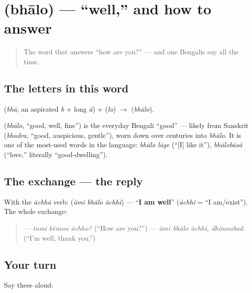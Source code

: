 \section[\bn{ভালো}]{ (bhālo) — \textquotedblleft{}well,\textquotedblright{} and how to answer}

\label{lesson:BN-C03-bhalo}



\begin{quote}
The word that answers \textquotedblleft{}how are you?\textquotedblright{} — and one Bengalis say all the time.
\end{quote}

\subsection*{The letters in this word}
\textbf{} (\emph{bhā}, an aspirated \emph{b} + long \emph{ā}) + \textbf{} (\emph{lo}) $\to$ \textbf{} (\emph{bhālo}).

\begin{cousinweb}
\textbf{} (\emph{bhālo}, \textquotedblleft{}good, well, fine\textquotedblright{}) is the everyday Bengali \textquotedblleft{}good\textquotedblright{} — likely from Sanskrit \textbf{} (\emph{bhadra}, \textquotedblleft{}good, auspicious, gentle\textquotedblright{}), worn down over centuries into \emph{bhālo}. It is one of the most-used words in the language: \emph{bhālo lāge} (\textquotedblleft{}{[}I{]} like it\textquotedblright{}), \emph{bhālobāsā} (\textquotedblleft{}love,\textquotedblright{} literally \textquotedblleft{}good-dwelling\textquotedblright{}).
\end{cousinweb}

\subsection*{The exchange — the reply}
With the \emph{āchhā} verb: \textbf{  } (\emph{āmi bhālo āchhi}) — \textquotedblleft{}\textbf{I am well}\textquotedblright{} (\emph{āchhi} = \textquotedblleft{}I am/exist\textquotedblright{}). The whole exchange:

\begin{quote}
— \emph{tumi kēmon āchho?} (\textquotedblleft{}How are you?\textquotedblright{}) — \emph{āmi bhālo āchhi, dhônnobad.} (\textquotedblleft{}I'm well, thank you.\textquotedblright{})
\end{quote}

\subsection*{Your turn}
Say these aloud:

